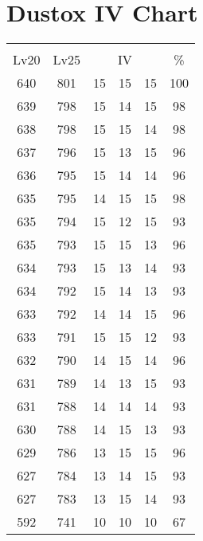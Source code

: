 \documentclass{article}%
\begin{document}
%
\normalsize%
\section{Dustox IV Chart}%
\label{sec:Dustox IV Chart}%
\renewcommand{\arraystretch}{1.5}%
\begin{tabular}{|c|c|c|c|c|c|}%
\hline%
\multicolumn{6}{|c|}{\textcolor{white}{ 
\linebreak{Dustox}
}%
\cellcolor{black}}\\%
\multicolumn{1}{|c}{Lv20}&\multicolumn{1}{c|}{Lv25}&\multicolumn{3}{c|}{IV}&\multicolumn{1}{|c|}{\%}\\%
\hline%
\rowcolor{color100}%
640&801&15&15&15&100\\%
\hline%
\rowcolor{color98}%
639&798&15&14&15&98\\%
\hline%
\rowcolor{color98}%
638&798&15&15&14&98\\%
\hline%
\rowcolor{color96}%
637&796&15&13&15&96\\%
\hline%
\rowcolor{color96}%
636&795&15&14&14&96\\%
\hline%
\rowcolor{color98}%
635&795&14&15&15&98\\%
\hline%
\rowcolor{color93}%
635&794&15&12&15&93\\%
\hline%
\rowcolor{color96}%
635&793&15&15&13&96\\%
\hline%
\rowcolor{color93}%
634&793&15&13&14&93\\%
\hline%
\rowcolor{color93}%
634&792&15&14&13&93\\%
\hline%
\rowcolor{color96}%
633&792&14&14&15&96\\%
\hline%
\rowcolor{color93}%
633&791&15&15&12&93\\%
\hline%
\rowcolor{color96}%
632&790&14&15&14&96\\%
\hline%
\rowcolor{color93}%
631&789&14&13&15&93\\%
\hline%
\rowcolor{color93}%
631&788&14&14&14&93\\%
\hline%
\rowcolor{color93}%
630&788&14&15&13&93\\%
\hline%
\rowcolor{color96}%
629&786&13&15&15&96\\%
\hline%
\rowcolor{color93}%
627&784&13&14&15&93\\%
\hline%
\rowcolor{color93}%
627&783&13&15&14&93\\%
\hline%
\rowcolor{color91}%
592&741&10&10&10&67\\%
\end{tabular}

%
\end{document}
